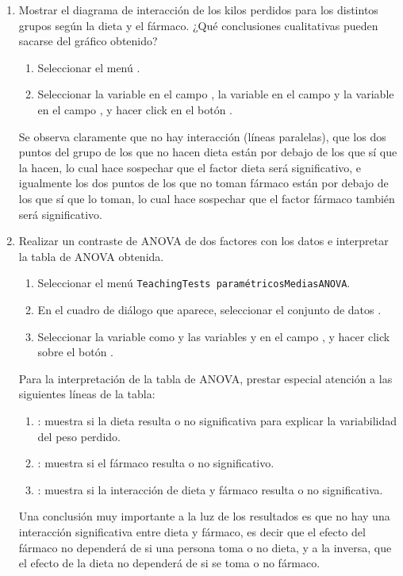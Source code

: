\begin{enumerate}[leftmargin=*]
\begin{enumerate}
\item Mostrar el diagrama de interacción de los kilos perdidos para los distintos grupos según la dieta y el fármaco.
¿Qué conclusiones cualitativas pueden sacarse del gráfico obtenido? 
\begin{indicacion}{
\begin{enumerate}
\item Seleccionar el menú .
\item Seleccionar la variable  en el campo , la variable
 en el campo  y la variable  en el campo , y hacer click en el botón .
\end{enumerate}
Se observa claramente que no hay interacción (líneas paralelas), que los dos puntos del grupo de los que no hacen dieta
están por debajo de los que sí que la hacen, lo cual hace sospechar que el factor dieta será significativo, e igualmente
los dos puntos de los que no toman fármaco están por debajo de los que sí que lo toman, lo cual hace sospechar que el
factor fármaco también será significativo. }
\end{indicacion}  


\item Realizar un contraste de ANOVA de dos factores con los datos e interpretar la tabla de ANOVA obtenida.
\begin{indicacion}{
\begin{enumerate}
\item Seleccionar el menú \texttt{Teaching\flecha Tests paramétricos\flecha Medias\flecha ANOVA}.
\item En el cuadro de diálogo que aparece, seleccionar el conjunto de datos .
\item Seleccionar la variable  como  y las variables
 y  en el campo , y hacer click sobre el botón
.
\end{enumerate}

Para la interpretación de la tabla de ANOVA, prestar especial atención a las siguientes líneas de la tabla:
\begin{enumerate}
\item {}: muestra si la dieta resulta o no significativa para explicar la variabilidad del peso perdido.
\item {}: muestra si el fármaco resulta o no significativo.
\item {}: muestra si la interacción de dieta y fármaco resulta o no significativa.
\end{enumerate}
Una conclusión muy importante a la luz de los resultados es que no hay una interacción significativa entre dieta y
fármaco, es decir que el efecto del fármaco no dependerá de si una persona toma o no dieta, y a la inversa, que el
efecto de la dieta no dependerá de si se toma o no fármaco.
}
\end{indicacion}


\end{enumerate}
\end{enumerate}
